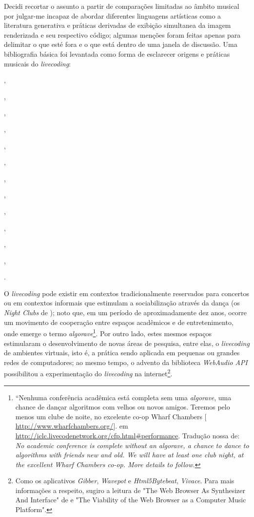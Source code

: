 Decidi recortar o assunto a partir de comparações limitadas ao âmbito musical por julgar-me incapaz de abordar diferentes linguagens artísticas como a literatura generativa e práticas derivadas de exibição simultanea da imagem renderizada e seu respectivo código; algumas menções foram feitas apenas para delimitar o que esté fora e o que está dentro de uma janela de discussão. Uma bibliografia básica foi levantada como forma de esclarecer origens e práticas musicais do \emph{livecoding}: \begin{inparaenum}[]
\item {},
\item {},
\item {},
\item {},
\item {},
\item {},
\item {},
\item {},
\item {},
\item {},
\item {},
\item {},
\item {}
\end{inparaenum}.


O \emph{livecoding} pode existir em contextos tradicionalmente reservados para concertos ou em contextos informais que estimulam a sociabilização através da dança (os \emph{Night Clubs} de ); noto que, em um período de aproximadamente dez anos, ocorre um movimento de cooperação entre espaços acadêmicos e de entretenimento, onde emerge o termo \emph{algorave}\footnote{``Nenhuma conferência acadêmica está completa sem uma \emph{algorave}, uma chance de dançar algoritmos com velhos ou novos amigos. Teremos pelo menos um clube de noite, no excelente co-op Wharf Chambers $[$\url{http://www.wharfchambers.org/}$]$. em \url{http://iclc.livecodenetwork.org/cfp.html\#performance}. Tradução nossa de: \emph{No academic conference is complete without an algorave, a chance to dance to algorithms with friends new and old. We will have at least one club night, at the excellent Wharf Chambers co-op. More details to follow.}}. Por outro lado, estes mesmos espaços estimularam o desenvolvimento de novas áreas de pesquisa, entre elas, o \emph{livecoding} de ambientes virtuais, isto é, a prática sendo aplicada em pequenas ou grandes redes de computadores; ao mesmo tempo, o advento da biblioteca \emph{WebAudio API} possibilitou a experimentação do \emph{livecoding} na internet\footnote{Como os aplicativos \emph{Gibber}, \emph{Wavepot} e \emph{Html5Bytebeat}, \emph{Vivace}. Para mais informações a respeito, sugiro a leitura de "The Web Browser As Synthesizer And Interface" de  e "The Viability of the Web Browser as a Computer Music Platform".}.

